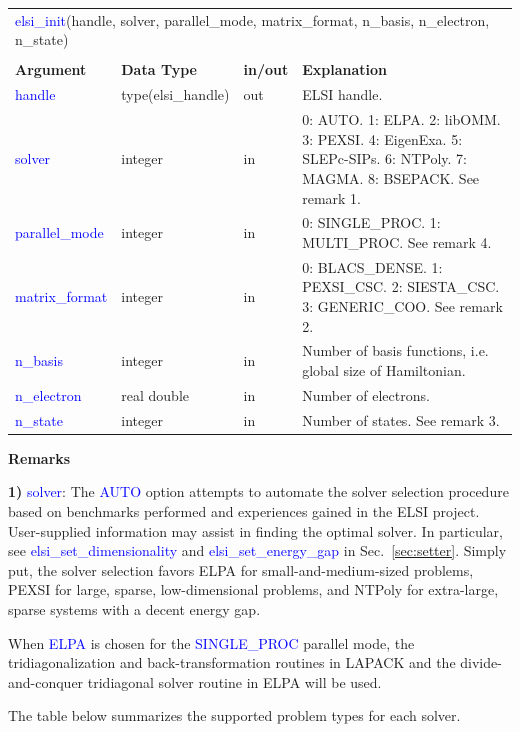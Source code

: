 \documentclass{report}
\newcommand{\tcb}[1]{\textcolor{blue}{#1}}
\begin{document}
\begin{tabular}[]{|p{30mm}|p{30mm}|p{15mm}|p{90mm}|}
\multicolumn{4}{l}{\tcb{elsi\_init}(handle, solver, parallel\_mode, matrix\_format, n\_basis, n\_electron, n\_state)}\\
\multicolumn{4}{l}{}\\
\hline
\multicolumn{1}{|l|}{\textbf{Argument}} & \multicolumn{1}{l|}{\textbf{Data Type}} & \multicolumn{1}{l|}{\textbf{in/out}} & \multicolumn{1}{l|}{\textbf{Explanation}}\\
\hline
\tcb{handle}         & type(elsi\_handle) & out & ELSI handle.\\
\hline
\tcb{solver}         & integer            & in  & 0: AUTO. 1: ELPA. 2: libOMM. 3: PEXSI. 4: EigenExa. 5: SLEPc-SIPs. 6: NTPoly. 7: MAGMA. 8: BSEPACK. See remark 1.\\
\hline
\tcb{parallel\_mode} & integer            & in  & 0: SINGLE\_PROC. 1: MULTI\_PROC. See remark 4.\\
\hline
\tcb{matrix\_format} & integer            & in  & 0: BLACS\_DENSE. 1: PEXSI\_CSC. 2: SIESTA\_CSC. 3: GENERIC\_COO. See remark 2.\\
\hline
\tcb{n\_basis}       & integer            & in  & Number of basis functions, i.e. global size of Hamiltonian.\\
\hline
\tcb{n\_electron}    & real double        & in  & Number of electrons.\\
\hline
\tcb{n\_state}       & integer            & in  & Number of states. See remark 3.\\
\hline
\end{tabular}

\textbf{Remarks}

\textbf{1)} \tcb{solver}: The \tcb{AUTO} option attempts to automate the solver selection procedure based on benchmarks performed and experiences gained in the ELSI project. User-supplied information may assist in finding the optimal solver. In particular, see \tcb{elsi\_set\_dimensionality} and \tcb{elsi\_set\_energy\_gap} in Sec.~\ref{sec:setter}. Simply put, the solver selection favors ELPA for small-and-medium-sized problems, PEXSI for large, sparse, low-dimensional problems, and NTPoly for extra-large, sparse systems with a decent energy gap.

When \tcb{ELPA} is chosen for the \tcb{SINGLE\_PROC} parallel mode, the tridiagonalization and back-transformation routines in LAPACK and the divide-and-conquer tridiagonal solver routine in ELPA will be used.

The table below summarizes the supported problem types for each solver.
\end{document}
